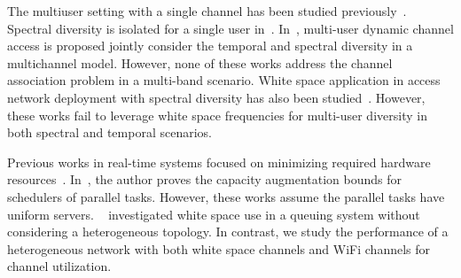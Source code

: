 The multiuser setting with a single channel has been studied previously~\cite{tan2010distributed}. 
Spectral diversity is isolated for a single user in~\cite{shu2009throughput}. In~\cite{liu2013stay}, 
multi-user dynamic channel access is proposed jointly consider the temporal and spectral diversity in a multichannel model. However, 
none of these works address the channel association problem in a multi-band scenario.
White space application in access network deployment with spectral diversity has also been studied~\cite{pcuiwinmee}. However, these works 
fail to leverage white space frequencies for multi-user diversity in both spectral and temporal scenarios.

Previous works in real-time systems focused on minimizing required hardware resources~\cite{nelissen2012techniques}.
In~\cite{li2014analysis}, the author proves the capacity augmentation bounds for schedulers of parallel tasks. 
However, these works assume the parallel tasks have uniform servers. 
~\cite{chen2011feasibility} investigated white space use in a queuing system without considering a 
heterogeneous topology.
In contrast, we study the performance of a heterogeneous network with both white space channels 
and WiFi channels for channel utilization. 



